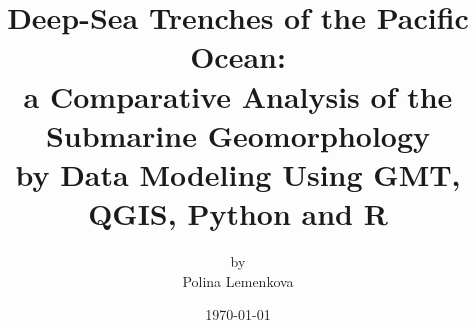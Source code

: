 \documentclass[11pt,a4paper]{report}
\begin{document}
\begin{titlepage}
	\title{
	Deep-Sea Trenches of the Pacific Ocean:\\ a Comparative Analysis of the Submarine Geomorphology  \\by Data Modeling Using GMT, QGIS, Python and R}
	\author[1]{by \\ 
	\vspace{30pt} Polina Lemenkova}
	\date{\today}
	\maketitle	
\end{titlepage}
\pagebreak









\end{document}
